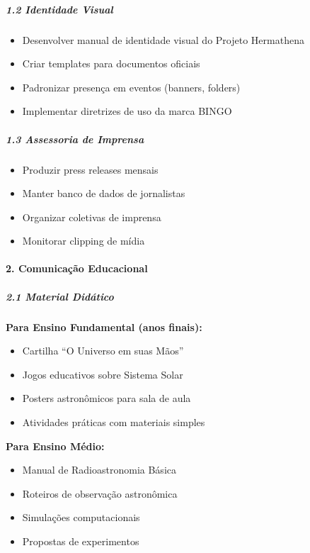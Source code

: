 \subparagraph{1.2 Identidade Visual}

\begin{itemize}
\item[$\square$] Desenvolver manual de identidade visual do Projeto Hermathena
\item[$\square$] Criar templates para documentos oficiais
\item[$\square$] Padronizar presença em eventos (banners, folders)
\item[$\square$] Implementar diretrizes de uso da marca BINGO
\end{itemize}

\subparagraph{1.3 Assessoria de Imprensa}

\begin{itemize}
\item[$\square$] Produzir press releases mensais
\item[$\square$] Manter banco de dados de jornalistas
\item[$\square$] Organizar coletivas de imprensa
\item[$\square$] Monitorar clipping de mídia
\end{itemize}

\paragraph{2. Comunicação Educacional}

\subparagraph{2.1 Material Didático}

\textbf{Para Ensino Fundamental (anos finais):}

\begin{itemize}
\item Cartilha ``O Universo em suas Mãos''
\item Jogos educativos sobre Sistema Solar
\item Posters astronômicos para sala de aula
\item Atividades práticas com materiais simples
\end{itemize}

\textbf{Para Ensino Médio:}

\begin{itemize}
\item Manual de Radioastronomia Básica
\item Roteiros de observação astronômica
\item Simulações computacionais
\item Propostas de experimentos
\end{itemize}

